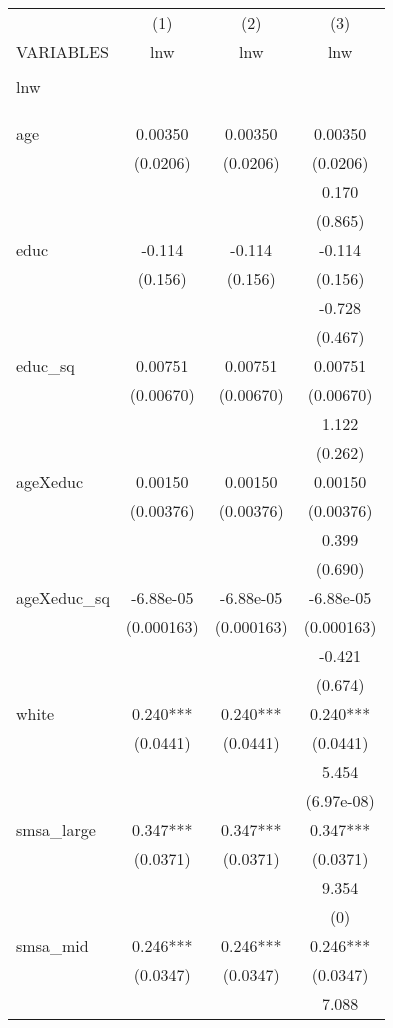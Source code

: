 \begin{tabular}{lccc} \hline
 & (1) & (2) & (3) \\
VARIABLES & lnw & lnw & lnw \\ \hline
 &  &  &  \\
lnw &  &  &  \\
 &  &  &  \\
 &  &  &  \\
 &  &  &  \\
age & 0.00350 & 0.00350 & 0.00350 \\
 & (0.0206) & (0.0206) & (0.0206) \\
 &  &  & 0.170 \\
 &  &  & (0.865) \\
educ & -0.114 & -0.114 & -0.114 \\
 & (0.156) & (0.156) & (0.156) \\
 &  &  & -0.728 \\
 &  &  & (0.467) \\
educ\_sq & 0.00751 & 0.00751 & 0.00751 \\
 & (0.00670) & (0.00670) & (0.00670) \\
 &  &  & 1.122 \\
 &  &  & (0.262) \\
ageXeduc & 0.00150 & 0.00150 & 0.00150 \\
 & (0.00376) & (0.00376) & (0.00376) \\
 &  &  & 0.399 \\
 &  &  & (0.690) \\
ageXeduc\_sq & -6.88e-05 & -6.88e-05 & -6.88e-05 \\
 & (0.000163) & (0.000163) & (0.000163) \\
 &  &  & -0.421 \\
 &  &  & (0.674) \\
white & 0.240*** & 0.240*** & 0.240*** \\
 & (0.0441) & (0.0441) & (0.0441) \\
 &  &  & 5.454 \\
 &  &  & (6.97e-08) \\
smsa\_large & 0.347*** & 0.347*** & 0.347*** \\
 & (0.0371) & (0.0371) & (0.0371) \\
 &  &  & 9.354 \\
 &  &  & (0) \\
smsa\_mid & 0.246*** & 0.246*** & 0.246*** \\
 & (0.0347) & (0.0347) & (0.0347) \\
 &  &  & 7.088 \\

\end{tabular}

